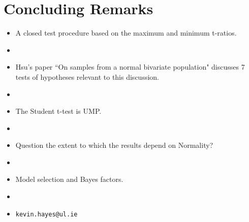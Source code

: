 \documentclass[a4]{beamer}
\begin{document}




\section{Concluding Remarks}

\begin{frame}
\begin{itemize}
\item A closed test procedure based on the maximum and minimum t-ratios.
\item[]
\item Hsu's paper ``On samples from a normal bivariate population" discusses 7 tests of hypotheses relevant to this discussion.
\item[]
\item The Student t-test is UMP.
\item[]
\item Question the extent to which the results depend on Normality?
\item[]
\item Model selection and Bayes factors.
\item[]
\item \texttt{kevin.hayes@ul.ie}
\end{itemize}
\end{frame}
\end{document}

